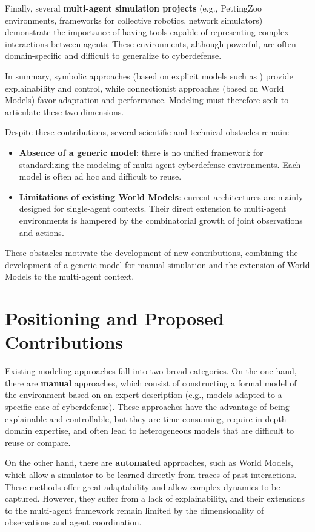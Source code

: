 Finally, several \textbf{multi-agent simulation projects} (e.g., PettingZoo environments, frameworks for collective robotics, network simulators) demonstrate the importance of having tools capable of representing complex interactions between agents.
These environments, although powerful, are often domain-specific and difficult to generalize to cyberdefense.

In summary, symbolic approaches (based on explicit models such as \phantom{XXXX} ) provide explainability and control, while connectionist approaches (based on World Models) favor adaptation and performance.
Modeling must therefore seek to articulate these two dimensions.

Despite these contributions, several scientific and technical obstacles remain:
\begin{itemize}
  \item \textbf{Absence of a generic model}: there is no unified framework for standardizing the modeling of multi-agent cyberdefense environments. Each model is often ad hoc and difficult to reuse.
  \item \textbf{Limitations of existing World Models}: current architectures are mainly designed for single-agent contexts. Their direct extension to multi-agent environments is hampered by the combinatorial growth of joint observations and actions.
\end{itemize}

These obstacles motivate the development of new contributions, combining the development of a generic model for manual simulation and the extension of World Models to the multi-agent context.

\section{Positioning and Proposed Contributions}

Existing modeling approaches fall into two broad categories.
On the one hand, there are \textbf{manual} approaches, which consist of constructing a formal model of the environment based on an expert description (e.g.,  models adapted to a specific case of cyberdefense). These approaches have the advantage of being explainable and controllable, but they are time-consuming, require in-depth domain expertise, and often lead to heterogeneous models that are difficult to reuse or compare.

On the other hand, there are \textbf{automated} approaches, such as World Models, which allow a simulator to be learned directly from traces of past interactions. These methods offer great adaptability and allow complex dynamics to be captured. However, they suffer from a lack of explainability, and their extensions to the multi-agent framework remain limited by the dimensionality of observations and agent coordination.

